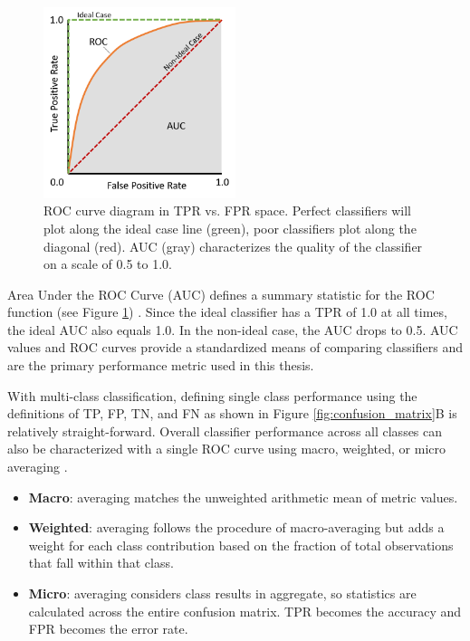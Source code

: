 \begin{figure}[!htp]
\centering
\includegraphics[width=0.5\textwidth]{templates/images/Figure-ROC_AUC_Diagram.png}
\caption[Receiver Operating Characteristic diagram]{ROC curve diagram in TPR vs. FPR space. Perfect classifiers will plot along the ideal case line (green), poor classifiers plot along the diagonal (red). AUC (gray) characterizes the quality of the classifier on a scale of 0.5 to 1.0.}
\label{fig:roc}
\end{figure}

Area Under the ROC Curve (AUC) defines a summary statistic for the ROC function (see Figure \ref{fig:roc}) \citep{fawcett_introduction_2006}. Since the ideal classifier has a TPR of 1.0 at all times, the ideal AUC also equals 1.0. In the non-ideal case, the AUC drops to 0.5. AUC values and ROC curves provide a standardized means of comparing classifiers and are the primary performance metric used in this thesis.

With multi-class classification, defining single class performance using the definitions of TP, FP, TN, and FN as shown in Figure \ref{fig:confusion_matrix}B is relatively straight-forward. Overall classifier performance across all classes can also be characterized with a single ROC curve using macro, weighted, or micro averaging \citep{scikit-learn_sklearnmetricsroc_auc_score_2021}.

\begin{itemize}[itemsep=2pt]
    \item \textbf{Macro}: averaging matches the unweighted arithmetic mean of metric values.
    \item \textbf{Weighted}: averaging follows the procedure of macro-averaging but adds a weight for each class contribution based on the fraction of total observations that fall within that class. 
    \item \textbf{Micro}: averaging considers class results in aggregate, so statistics are calculated across the entire confusion matrix. TPR becomes the accuracy and FPR becomes the error rate.
\end{itemize}

